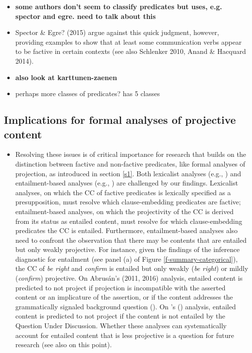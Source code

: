 \documentclass[11pt,fleqn]{article}
\newcommand{\6}{\mbox{$[\hspace*{-.6mm}[$}}
\newcommand{\9}{\mbox{$]\hspace*{-.6mm}]$}}
\newcommand{\citetpos}[1]{\citeauthor{#1}'s (\citeyear{#1})}
\begin{document}
{\begin{itemize}
\item {\bf some authors don't seem to classify predicates but uses, e.g. spector and egre. need to talk about this} 

\item Spector \& Egre? (2015) argue against this quick judgment, however, providing examples to show that at least some communication verbs appear to be factive in certain contexts (see also Schlenker 2010, Anand \& Hacquard 2014).

\item {\bf also look at karttunen-zaenen}

\item perhaps more classes of predicates? \citet{karttunen2016} has 5 classes

\end{itemize}

\subsection{Implications for formal analyses of projective content}

\begin{itemize}

\item Resolving these issues is of critical importance for research that builds on the distinction between factive and non-factive predicates, like formal analyses of projection, as introduced in section \ref{s1}. Both lexicalist analyses (e.g., \citealt{heim83,vds92}) and entailment-based analyses (e.g., \citealt{abrusan2011,abrusan2016,romoli2015,best-question}) are challenged by our findings. Lexicalist analyses, on which the CC of factive predicates is lexically specified as a presupposition, must resolve which clause-embedding predicates are factive; entailment-based analyses, on which the projectivity of the CC is derived from its status as entailed content, must resolve for which clause-embedding predicates the CC is entailed. Furthermore, entailment-based analyses also need to confront the observation that there may be contents that are entailed but only weakly projective. For instance, given the findings of the inference diagnostic for entailment (see panel (a) of Figure \ref{f-summary-categorical}), the CC of {\em be right} and {\em confirm} is entailed but only weakly  ({\em be right}) or mildly ({\em confirm}) projective. On Abrus\'an's (2011, 2016) analysis, entailed content is predicted to not project if projection is incompatible with the asserted content or an implicature of the assertion, or if the content addresses the grammatically signaled background question (\citealt[511, 532]{abrusan2011}). On  \citetpos{best-question} analysis, entailed content is predicted to not project if the content is not entailed by the Question Under Discussion. Whether these analyses can systematically account for entailed content that is less projective is a question for future research (see also \citealt{tbd-variability} on this point).


\end{itemize}}
\end{document}
